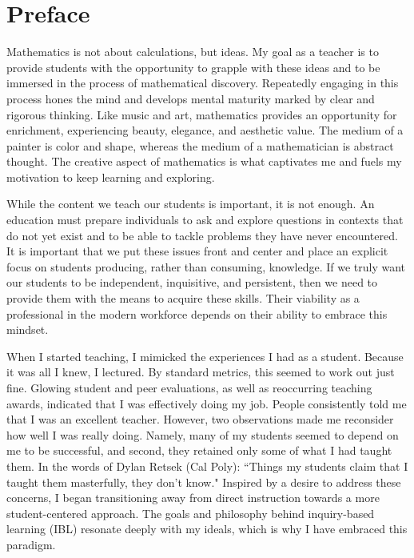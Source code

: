 \chapter*{Preface}

Mathematics is not about calculations, but ideas. My goal as a teacher is to provide students with the opportunity to grapple with these ideas and to be immersed in the process of mathematical discovery. Repeatedly engaging in this process hones the mind and develops mental maturity marked by clear and rigorous thinking. Like music and art, mathematics provides an opportunity for enrichment, experiencing beauty, elegance, and aesthetic value. The medium of a painter is color and shape, whereas the medium of a mathematician is abstract thought. The creative aspect of mathematics is what captivates me and fuels my motivation to keep learning and exploring.

While the content we teach our students is important, it is not enough. An education must prepare individuals to ask and explore questions in contexts that do not yet exist and to be able to tackle problems they have never encountered. It is important that we put these issues front and center and place an explicit focus on students producing, rather than consuming, knowledge. If we truly want our students to be independent, inquisitive, and persistent, then we need to provide them with the means to acquire these skills. Their viability as a professional in the modern workforce depends on their ability to embrace this mindset.

When I started teaching, I mimicked the experiences I had as a student. Because it was all I knew, I lectured. By standard metrics, this seemed to work out just fine. Glowing student and peer evaluations, as well as reoccurring teaching awards, indicated that I was effectively doing my job. People consistently told me that I was an excellent teacher. However, two observations made me reconsider how well I was really doing. Namely, many of my students seemed to depend on me to be successful, and second, they retained only some of what I had taught them. In the words of Dylan Retsek (Cal Poly):
``Things my students claim that I taught them masterfully, they don't know."
Inspired by a desire to address these concerns, I began transitioning away from direct instruction towards a more student-centered approach. The goals and philosophy behind inquiry-based learning (IBL) resonate deeply with my ideals, which is why I have embraced this paradigm.

